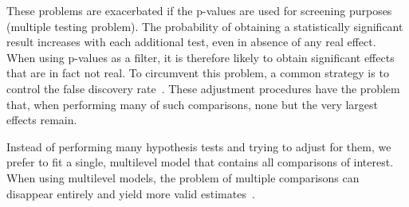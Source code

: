 \documentclass{bioinfo}
\begin{document}
These problems are exacerbated if the p-values are used for screening purposes (multiple testing problem). The probability  of  obtaining a statistically significant result increases with each additional test, even in absence of any real effect. When using p-values as a filter, it is therefore likely to obtain significant effects that are in fact not real. To circumvent this problem, a common strategy is to control the false discovery rate~\citep{Benjamini1995}. These adjustment procedures have the problem that, when performing many of such comparisons, none but the very largest effects remain.

Instead of performing many hypothesis tests and trying to adjust for them, we prefer to fit a single, multilevel model that contains all comparisons of interest. When using multilevel models, the problem of multiple comparisons can disappear entirely and yield more valid estimates~\citep{Gelman2012}.
\end{document}
